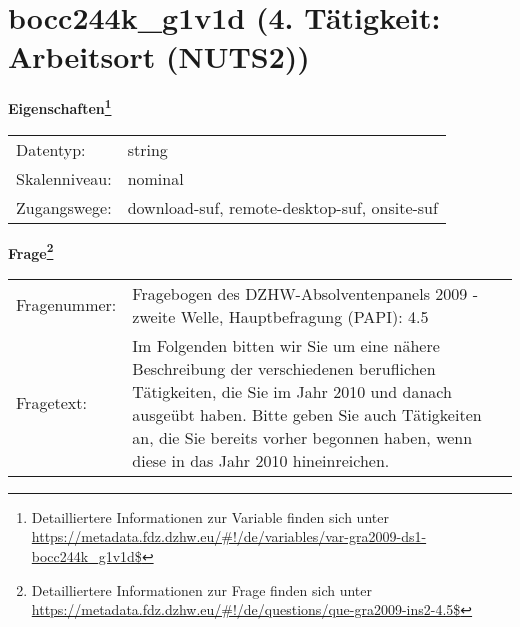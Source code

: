 
    \setcounter{footnote}{0}

    \vspace*{-1.8cm}
	\section{bocc244k\_g1v1d (4. Tätigkeit: Arbeitsort (NUTS2))}
	\label{section:bocc244k_g1v1d}



    \vspace*{0.5cm}
    \noindent\textbf{Eigenschaften\footnote{Detailliertere Informationen zur Variable finden sich unter
		\url{https://metadata.fdz.dzhw.eu/\#!/de/variables/var-gra2009-ds1-bocc244k_g1v1d$}}}\\
	\begin{tabularx}{\hsize}{@{}lX}
	Datentyp: & string \\
	Skalenniveau: & nominal \\
	Zugangswege: &
	  download-suf, 
	  remote-desktop-suf, 
	  onsite-suf
 \\
    \end{tabularx}



				\vspace*{0.5cm}
                \noindent\textbf{Frage\footnote{Detailliertere Informationen zur Frage finden sich unter
		              \url{https://metadata.fdz.dzhw.eu/\#!/de/questions/que-gra2009-ins2-4.5$}}}\\
				\begin{tabularx}{\hsize}{@{}lX}
					Fragenummer: &
					  Fragebogen des DZHW-Absolventenpanels 2009 - zweite Welle, Hauptbefragung (PAPI):
					  4.5
 \\
					Fragetext: & Im Folgenden bitten wir Sie um eine nähere Beschreibung der verschiedenen beruflichen Tätigkeiten, die Sie im Jahr 2010 und danach ausgeübt haben. Bitte geben Sie auch Tätigkeiten an, die Sie bereits vorher begonnen haben, wenn diese in das Jahr 2010 hineinreichen. \\
				\end{tabularx}





